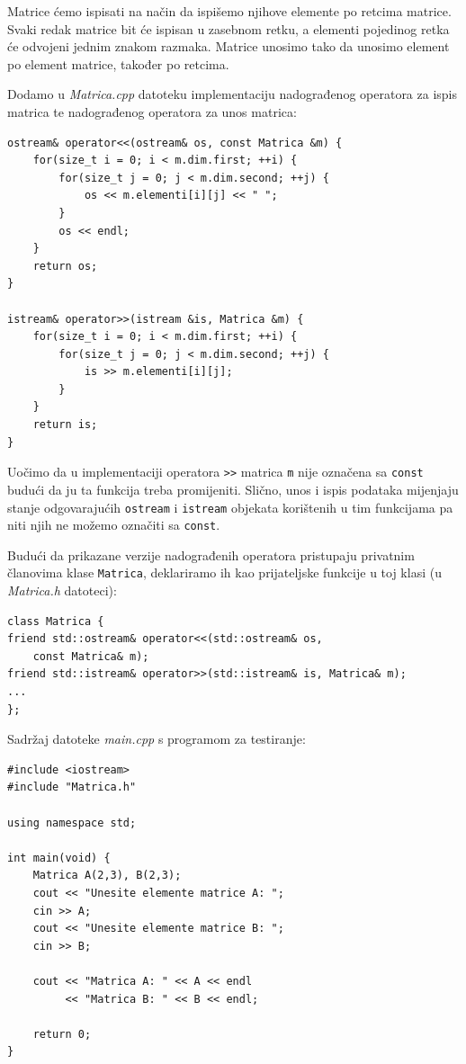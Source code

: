 \begin{rjesenje}
Matrice ćemo ispisati na način da ispišemo njihove elemente po retcima matrice.
Svaki redak matrice bit će ispisan u zasebnom retku, a
elementi pojedinog retka će odvojeni jednim znakom razmaka.
Matrice unosimo tako da unosimo element po element matrice, također po retcima.
\medskip

Dodamo u \textit{Matrica.cpp} datoteku implementaciju nadograđenog operatora za ispis matrica
te nadograđenog operatora za unos matrica:
\begin{verbatim}
ostream& operator<<(ostream& os, const Matrica &m) {
    for(size_t i = 0; i < m.dim.first; ++i) {
        for(size_t j = 0; j < m.dim.second; ++j) {
            os << m.elementi[i][j] << " ";
        }
        os << endl;
    }
    return os;
}

istream& operator>>(istream &is, Matrica &m) {
    for(size_t i = 0; i < m.dim.first; ++i) {
        for(size_t j = 0; j < m.dim.second; ++j) {
            is >> m.elementi[i][j];
        }
    }
    return is;
}
\end{verbatim}
Uočimo da u implementaciji operatora \texttt{>\!>}
matrica \texttt{m} nije označena sa \texttt{const}
budući da ju ta funkcija treba promijeniti.
Slično, unos i ispis podataka mijenjaju stanje odgovarajućih \texttt{ostream}
i \texttt{istream} objekata korištenih u tim funkcijama pa niti njih ne možemo označiti sa \texttt{const}.
\medskip

Budući da prikazane verzije nadograđenih operatora pristupaju
privatnim članovima klase \texttt{Matrica},
deklariramo ih kao prijateljske funkcije u toj klasi
(u \textit{Matrica.h} datoteci):
\begin{verbatim}
class Matrica {
friend std::ostream& operator<<(std::ostream& os, 
    const Matrica& m);
friend std::istream& operator>>(std::istream& is, Matrica& m);
...
};
\end{verbatim}

Sadržaj datoteke \textit{main.cpp} s programom za testiranje:
\begin{verbatim}
#include <iostream>
#include "Matrica.h"

using namespace std;

int main(void) {
    Matrica A(2,3), B(2,3);
    cout << "Unesite elemente matrice A: ";
    cin >> A;
    cout << "Unesite elemente matrice B: ";
    cin >> B;

    cout << "Matrica A: " << A << endl
         << "Matrica B: " << B << endl;

    return 0;
}
\end{verbatim}
\end{rjesenje}

